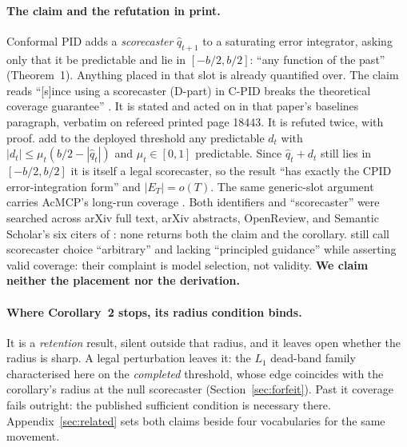 \paragraph{The claim and the refutation in print.} Conformal PID \citep{angelopoulos2023pid}
adds a \emph{scorecaster} $\hat{q}_{t+1}$ to a saturating error integrator, asking only that it
be predictable and lie in $[-b/2,b/2]$: ``any function of the past'' (Theorem~1). Anything placed
in that slot is already quantified over. The claim reads ``[s]ince using a scorecaster (D-part) in
C-PID breaks the theoretical coverage guarantee'' \citep{li2024neuralconformal}. It is stated and
acted on in that paper's baselines paragraph, verbatim on refereed printed page 18443. It is refuted
twice, with proof. \citet[Corollary~2]{li2025o2cp} add to the deployed threshold any predictable
$d_t$ with $|d_t| \le \mu_t(b/2-|\hat{q}_t|)$ and $\mu_t \in [0,1]$ predictable. Since
$\hat{q}_t + d_t$ still lies in $[-b/2,b/2]$ it is itself a legal scorecaster, so the result
``has exactly the CPID error-integration form'' and $|E_T| = o(T)$. The same generic-slot argument
carries AcMCP's long-run coverage \citep{wang2026acmcp}. Both identifiers and ``scorecaster'' were
searched across arXiv full text, arXiv abstracts, OpenReview, and Semantic Scholar's six citers of
\mbox{\citet{li2024neuralconformal}}: none returns both the claim and the corollary.
\citet{hu2026distinformed} still call scorecaster choice ``arbitrary'' and lacking ``principled
guidance'' while asserting valid coverage: their complaint is model selection, not validity. \textbf{We claim
neither the placement nor the derivation.}

\paragraph{Where Corollary~2 stops, its radius condition binds.} It is a \emph{retention} result, silent
outside that radius, and it leaves open whether the radius is sharp.
A legal perturbation leaves it: the $L_1$ dead-band family
characterised here on the \emph{completed} threshold, whose edge coincides with the corollary's
radius at the null scorecaster (Section~\ref{sec:forfeit}). Past it coverage fails outright: the published
sufficient condition is necessary there. Appendix~\ref{sec:related} sets both claims beside four
vocabularies for the same movement.
